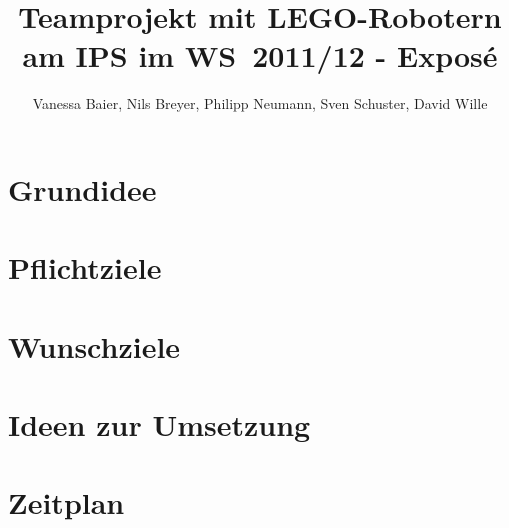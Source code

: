 \documentclass[a4paper,12pt]{article}
\begin{document}
\author{Vanessa Baier, Nils Breyer, Philipp Neumann, Sven Schuster, David Wille}
\title{Teamprojekt mit LEGO-Robotern am IPS im \mbox{WS 2011/12} - Exposé}

\maketitle

\section{Grundidee}

\section{Pflichtziele}

\section{Wunschziele}

\section{Ideen zur Umsetzung}

\section{Zeitplan}
\end{document}
